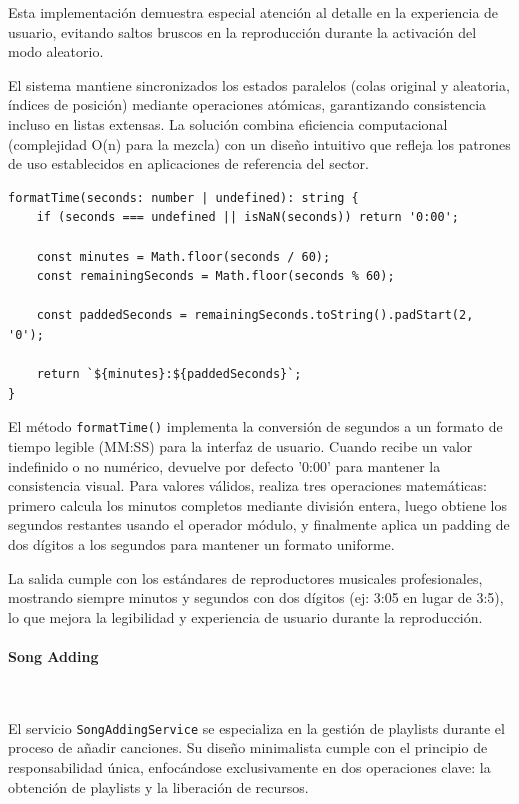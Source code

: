 \documentclass[11pt, a4paper]{article}
\begin{document}
                Esta implementación demuestra especial atención al detalle en la experiencia de usuario, evitando saltos bruscos en la reproducción durante la activación del modo aleatorio.

                El sistema mantiene sincronizados los estados paralelos (colas original y aleatoria, índices de posición) mediante operaciones atómicas, garantizando consistencia incluso en listas extensas. La solución combina eficiencia computacional (complejidad O(n) para la mezcla) con un diseño intuitivo que refleja los patrones de uso establecidos en aplicaciones de referencia del sector.

                \begin{lstlisting}[caption={formatTime()}]
formatTime(seconds: number | undefined): string {
    if (seconds === undefined || isNaN(seconds)) return '0:00';
    
    const minutes = Math.floor(seconds / 60);
    const remainingSeconds = Math.floor(seconds % 60);
    
    const paddedSeconds = remainingSeconds.toString().padStart(2, '0');
    
    return `${minutes}:${paddedSeconds}`;
}
                \end{lstlisting}

                El método \verb|formatTime()| implementa la conversión de segundos a un formato de tiempo legible (MM:SS) para la interfaz de usuario. Cuando recibe un valor indefinido o no numérico, devuelve por defecto '0:00' para mantener la consistencia visual. Para valores válidos, realiza tres operaciones matemáticas: primero calcula los minutos completos mediante división entera, luego obtiene los segundos restantes usando el operador módulo, y finalmente aplica un padding de dos dígitos a los segundos para mantener un formato uniforme.

                La salida cumple con los estándares de reproductores musicales profesionales, mostrando siempre minutos y segundos con dos dígitos (ej: 3:05 en lugar de 3:5), lo que mejora la legibilidad y experiencia de usuario durante la reproducción.

                \paragraph{Song Adding}
                ‎

                El servicio \verb|SongAddingService| se especializa en la gestión de playlists durante el proceso de añadir canciones. Su diseño minimalista cumple con el principio de responsabilidad única, enfocándose exclusivamente en dos operaciones clave: la obtención de playlists y la liberación de recursos.
\end{document}

